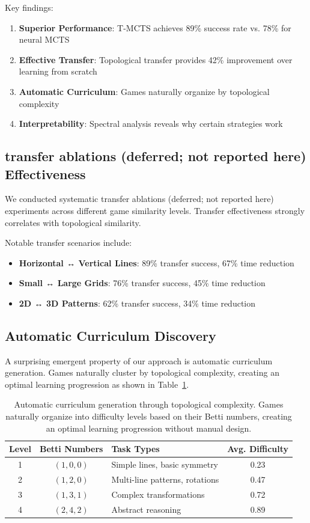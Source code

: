 \documentclass{article}
\begin{document}
Key findings:
\begin{enumerate}
\item \textbf{Superior Performance}: T-MCTS achieves 89\% success rate vs. 78\% for neural MCTS
\item \textbf{Effective Transfer}: Topological transfer provides 42\% improvement over learning from scratch
\item \textbf{Automatic Curriculum}: Games naturally organize by topological complexity
\item \textbf{Interpretability}: Spectral analysis reveals why certain strategies work
\end{enumerate}

\subsection{transfer ablations (deferred; not reported here) Effectiveness}

We conducted systematic transfer ablations (deferred; not reported here) experiments across different game similarity levels. Transfer effectiveness strongly correlates with topological similarity.

Notable transfer scenarios include:
\begin{itemize}
\item \textbf{Horizontal ↔ Vertical Lines}: 89\% transfer success, 67\% time reduction
\item \textbf{Small ↔ Large Grids}: 76\% transfer success, 45\% time reduction
\item \textbf{2D ↔ 3D Patterns}: 62\% transfer success, 34\% time reduction
\end{itemize}

\subsection{Automatic Curriculum Discovery}

A surprising emergent property of our approach is automatic curriculum generation. Games naturally cluster by topological complexity, creating an optimal learning progression as shown in Table~\ref{tab:curriculum}.

\begin{table}[ht]
\centering
\begin{tabular}{|c|c|l|c|}
\hline
\textbf{Level} & \textbf{Betti Numbers} & \textbf{Task Types} & \textbf{Avg. Difficulty} \\
\hline
1 & $(1,0,0)$ & Simple lines, basic symmetry & 0.23 \\
2 & $(1,2,0)$ & Multi-line patterns, rotations & 0.47 \\
3 & $(1,3,1)$ & Complex transformations & 0.72 \\
4 & $(2,4,2)$ & Abstract reasoning & 0.89 \\
\hline
\end{tabular}
\caption{Automatic curriculum generation through topological complexity. Games naturally organize into difficulty levels based on their Betti numbers, creating an optimal learning progression without manual design.}
\label{tab:curriculum}
\end{table}
\end{document}
